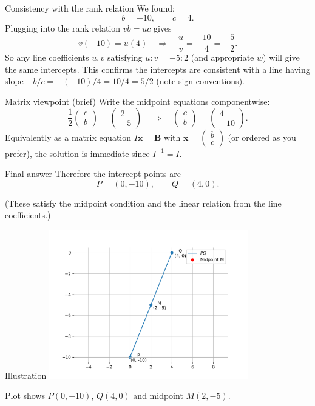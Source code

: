 \documentclass{beamer}
\begin{document}
\begin{frame}{Consistency with the rank relation}
We found:
\[
b=-10,\qquad c=4.
\]
Plugging into the rank relation \(v b = u c\) gives
\[
v(-10) = u(4) \quad\Rightarrow\quad \frac{u}{v} = -\frac{10}{4} = -\frac{5}{2}.
\]
So any line coefficients \(u,v\) satisfying \(u:v = -5:2\) (and appropriate \(w\)) will give the same intercepts. This confirms the intercepts are consistent with a line having slope \(-b/c = -(-10)/4 = 10/4 = 5/2\) (note sign conventions).
\end{frame}

\begin{frame}{Matrix viewpoint (brief)}
Write the midpoint equations componentwise:
\[
\frac{1}{2}\begin{pmatrix}c\\b\end{pmatrix} = \begin{pmatrix}2\\-5\end{pmatrix}
\quad\Longrightarrow\quad
\begin{pmatrix}c\\b\end{pmatrix} = \begin{pmatrix}4\\-10\end{pmatrix}.
\]
Equivalently as a matrix equation \(I\mathbf{x}=\mathbf{B}\) with
\(\mathbf{x}=\begin{pmatrix}b\\c\end{pmatrix}\) (or ordered as you prefer),
the solution is immediate since \(I^{-1}=I\).
\end{frame}

\begin{frame}{Final answer}
Therefore the intercept points are
\[
\boxed{P=(0,-10),\qquad Q=(4,0).}
\]

\bigskip
(These satisfy the midpoint condition and the linear relation from the line coefficients.)
\end{frame}

\begin{frame}{Illustration}
\centering
\includegraphics[width=0.65\textwidth]{figs/fig.png}

\bigskip
Plot shows \(P(0,-10)\), \(Q(4,0)\) and midpoint \(M(2,-5)\).
\end{frame}
\end{document}
